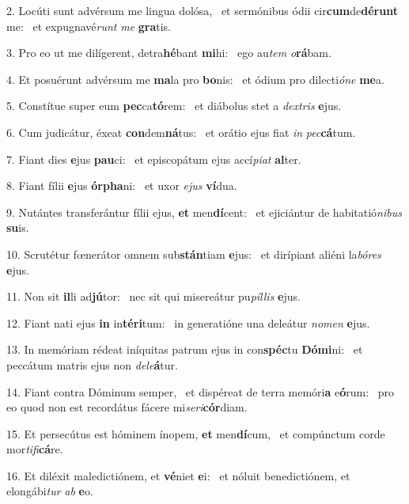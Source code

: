 2. Locúti sunt advérsum me lingua dolósa, \dag\  et sermónibus ódii cir\textbf{cum}de\textbf{dé}\textbf{runt} me: \ast\  et expugnavé\textit{runt} \textit{me} \textbf{gra}tis.\

3. Pro eo ut me dilígerent, detra\textbf{hé}bant \textbf{mi}hi: \ast\  ego au\textit{tem} \textit{o}\textbf{rá}bam.\

4. Et posuérunt advérsum me \textbf{ma}la pro \textbf{bo}nis: \ast\  et ódium pro dilecti\textit{ó}\textit{ne} \textbf{me}a.\

5. Constítue super eum \textbf{pec}ca\textbf{tó}rem: \ast\  et diábolus stet a \textit{dex}\textit{tris} \textbf{e}jus.\

6. Cum judicátur, éxeat \textbf{con}dem\textbf{ná}tus: \ast\  et orátio ejus fiat \textit{in} \textit{pec}\textbf{cá}tum.\

7. Fiant dies \textbf{e}jus \textbf{pau}ci: \ast\  et episcopátum ejus accí\textit{pi}\textit{at} \textbf{al}ter.\

8. Fiant fílii \textbf{e}jus \textbf{ór}\textbf{pha}ni: \ast\  et uxor \textit{e}\textit{jus} \textbf{ví}dua.\

9. Nutántes transferántur fílii ejus, \textbf{et} men\textbf{dí}cent: \ast\  et ejiciántur de habitatió\textit{ni}\textit{bus} \textbf{su}is.\

10. Scrutétur fœnerátor omnem sub\textbf{stán}tiam \textbf{e}jus: \ast\  et dirípiant aliéni la\textit{bó}\textit{res} \textbf{e}jus.\

11. Non sit \textbf{il}li ad\textbf{jú}tor: \ast\  nec sit qui misereátur pu\textit{píl}\textit{lis} \textbf{e}jus.\

12. Fiant nati ejus \textbf{in} in\textbf{tér}\textbf{i}tum: \ast\  in generatióne una deleátur \textit{no}\textit{men} \textbf{e}jus.\

13. In memóriam rédeat iníquitas patrum ejus in con\textbf{spéc}tu \textbf{Dó}\textbf{mi}ni: \ast\  et peccátum matris ejus non \textit{de}\textit{le}\textbf{á}tur.\

14. Fiant contra Dóminum semper, \dag\  et dispéreat de terra memóri\textbf{a} e\textbf{ó}rum: \ast\  pro eo quod non est recordátus fácere mi\textit{se}\textit{ri}\textbf{cór}diam.\

15. Et persecútus est hóminem ínopem, \textbf{et} men\textbf{dí}cum, \ast\  et compúnctum corde mor\textit{ti}\textit{fi}\textbf{cá}re.\

16. Et diléxit maledictiónem, et \textbf{vé}niet \textbf{e}i: \ast\  et nóluit benedictiónem, et elongábi\textit{tur} \textit{ab} \textbf{e}o.\

